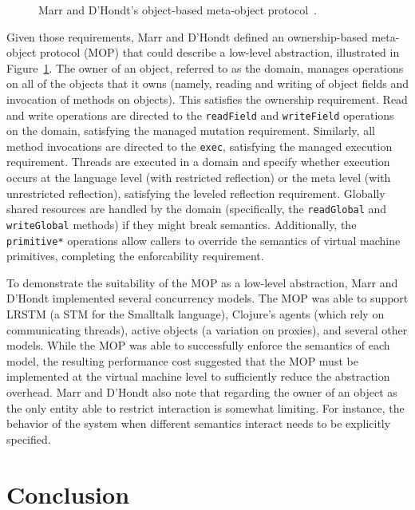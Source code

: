 \documentclass{sig-alternate}
\newcommand{\code}[1]{\texttt{#1}}
\begin{document}
\begin{figure}[ht]
  \centering
  \resizebox{0.63\linewidth}{!}{}
  \caption{Marr and D'Hondt's object-based meta-object protocol~\cite{Marr2012}.}
\label{figure:obmop}
\end{figure}

Given those requirements, Marr and D'Hondt defined an ownership-based meta-object protocol (MOP) that could describe a low-level abstraction, illustrated in Figure~\ref{figure:obmop}. The owner of an object, referred to as the domain, manages operations on all of the objects that it owns (namely, reading and writing of object fields and invocation of methods on objects). This satisfies the ownership requirement. Read and write operations are directed to the \code{readField} and \code{writeField} operations on the domain, satisfying the managed mutation requirement. Similarly, all method invocations are directed to the \code{exec}, satisfying the managed execution requirement. Threads are executed in a domain and specify whether execution occurs at the language level (with restricted reflection) or the meta level (with unrestricted reflection), satisfying the leveled reflection requirement. Globally shared resources are handled by the domain (specifically, the \code{readGlobal} and \code{writeGlobal} methods) if they might break semantics. Additionally, the \code{primitive*} operations allow callers to override the semantics of virtual machine primitives, completing the enforcability requirement.

To demonstrate the suitability of the MOP as a low-level abstraction, Marr and D'Hondt implemented several concurrency models. The MOP was able to support LRSTM (a STM for the Smalltalk language), Clojure's agents (which rely on communicating threads), active objects (a variation on proxies), and several other models. While the MOP was able to successfully enforce the semantics of each model, the resulting performance cost suggested that the MOP must be implemented at the virtual machine level to sufficiently reduce the abstraction overhead. Marr and D'Hondt also note that regarding the owner of an object as the only entity able to restrict interaction is somewhat limiting. For instance, the behavior of the system when different semantics interact needs to be explicitly specified.

\section{Conclusion}
\end{document}
